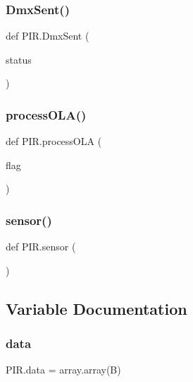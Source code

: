 \subsubsection{\texorpdfstring{Dmx\+Sent()}{DmxSent()}}
{\footnotesize\ttfamily def P\+I\+R.\+Dmx\+Sent (\begin{DoxyParamCaption}\item[{}]{status }\end{DoxyParamCaption})}

\mbox{\label{namespacePIR_a73b3e8262186dd13e1241f48eb9c4870}} 
\subsubsection{\texorpdfstring{process\+O\+L\+A()}{processOLA()}}
{\footnotesize\ttfamily def P\+I\+R.\+process\+O\+LA (\begin{DoxyParamCaption}\item[{}]{flag }\end{DoxyParamCaption})}

\mbox{\label{namespacePIR_a4004ed7a5eb2d52ce539fffd7b6db672}} 
\subsubsection{\texorpdfstring{sensor()}{sensor()}}
{\footnotesize\ttfamily def P\+I\+R.\+sensor (\begin{DoxyParamCaption}{ }\end{DoxyParamCaption})}



\subsection{Variable Documentation}
\mbox{\label{namespacePIR_aafc26dea0dec5027c9733ee5f828f40c}} 
\subsubsection{\texorpdfstring{data}{data}}
{\footnotesize\ttfamily P\+I\+R.\+data = array.\+array(\textquotesingle{}B\textquotesingle{})}

